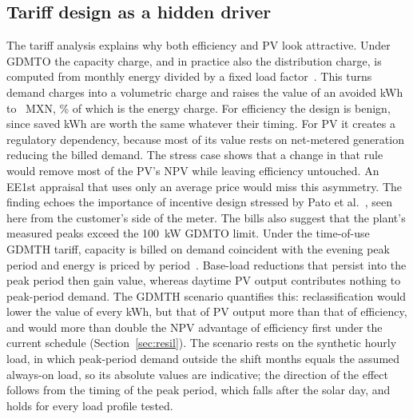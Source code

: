 \documentclass[processes,article,submit,pdftex,moreauthors]{Definitions/mdpi}
\newcommand{\MXN}{MXN}
\begin{document}
\subsection{Tariff design as a hidden driver}
The tariff analysis explains why both efficiency and PV look attractive. Under GDMTO the capacity charge, and in practice also the distribution charge, is computed from monthly energy divided by a fixed load factor~\cite{dof2025tariffs}. This turns demand charges into a volumetric charge and raises the value of an avoided kWh to \nTMarg~\MXN, \nTEnergyShare\% of which is the energy charge. For efficiency the design is benign, since saved kWh are worth the same whatever their timing. For PV it creates a regulatory dependency, because most of its value rests on net-metered generation reducing the billed demand. The stress case shows that a change in that rule would remove most of the PV's NPV while leaving efficiency untouched. An EE1st appraisal that uses only an average price would miss this asymmetry. The finding echoes the importance of incentive design stressed by Pato et al.~\cite{pato2022}, seen here from the customer's side of the meter. The bills also suggest that the plant's measured peaks exceed the 100~kW GDMTO limit. Under the time-of-use GDMTH tariff, capacity is billed on demand coincident with the evening peak period and energy is priced by period~\cite{dof2025tariffs}. Base-load reductions that persist into the peak period then gain value, whereas daytime PV output contributes nothing to peak-period demand. The GDMTH scenario quantifies this: reclassification would lower the value of every kWh, but that of PV output more than that of efficiency, and would more than double the NPV advantage of efficiency first under the current schedule (Section~\ref{sec:resil}). The scenario rests on the synthetic hourly load, in which peak-period demand outside the shift months equals the assumed always-on load, so its absolute values are indicative; the direction of the effect follows from the timing of the peak period, which falls after the solar day, and holds for every load profile tested.
\end{document}
